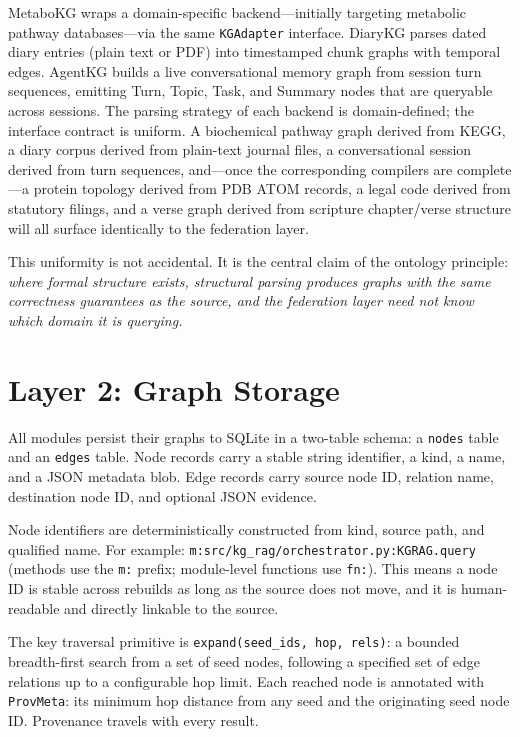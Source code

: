 \documentclass[10pt]{article}
\begin{document}
MetaboKG wraps a domain-specific backend---initially targeting metabolic
pathway databases---via the same \texttt{KGAdapter} interface. DiaryKG parses
dated diary entries (plain text or PDF) into timestamped chunk graphs with
temporal edges. AgentKG builds a live conversational memory graph from session
turn sequences, emitting Turn, Topic, Task, and Summary nodes that are
queryable across sessions. The parsing strategy of each backend is
domain-defined; the interface contract is uniform. A biochemical pathway
graph derived from KEGG, a diary corpus derived from plain-text journal
files, a conversational session derived from turn sequences, and---once the
corresponding compilers are complete---a protein topology derived from PDB
ATOM records, a legal code derived from statutory filings, and a verse
graph derived from scripture chapter/verse structure will all surface
identically to the federation layer.

This uniformity is not accidental. It is the central claim of the ontology
principle: \emph{where formal structure exists, structural parsing produces
graphs with the same correctness guarantees as the source, and the federation
layer need not know which domain it is querying.}

\section{Layer 2: Graph Storage}

All modules persist their graphs to SQLite in a two-table schema: a
\texttt{nodes} table and an \texttt{edges} table. Node records carry a stable
string identifier, a kind, a name, and a JSON metadata blob. Edge records carry
source node ID, relation name, destination node ID, and optional JSON evidence.

Node identifiers are deterministically constructed from kind, source path, and
qualified name. For example: \texttt{m:src/kg\_rag/orchestrator.py:KGRAG.query} (methods use the \texttt{m:} prefix; module-level functions use \texttt{fn:}).
This means a node ID is stable across rebuilds as long as the source does not
move, and it is human-readable and directly linkable to the source.

The key traversal primitive is \texttt{expand(seed\_ids, hop, rels)}: a bounded
breadth-first search from a set of seed nodes, following a specified set of edge
relations up to a configurable hop limit. Each reached node is annotated with
\texttt{ProvMeta}: its minimum hop distance from any seed and the originating
seed node ID. Provenance travels with every result.
\end{document}
